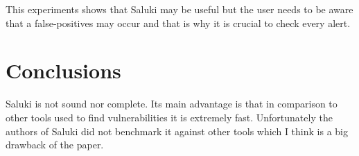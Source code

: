 \documentclass[a4paper, 12pt, journal, onecolumn]{IEEEtran}
\begin{document}
This experiments shows that Saluki may be useful but the user needs to be aware that a false-positives may occur and that is why it is crucial to check every alert. 


\section{Conclusions}

Saluki is not sound nor complete. Its main advantage is that in comparison to other tools used to find vulnerabilities it is extremely fast. Unfortunately the authors of Saluki did not benchmark it against other tools which I think is a big drawback of the paper.




\end{document}
